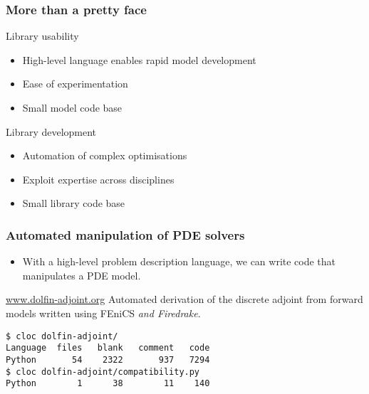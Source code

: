 \documentclass[presentation]{beamer}
\begin{document}
\begin{frame}
  \frametitle{More than a pretty face}

  \begin{block}{Library usability}
    \begin{itemize}
    \item High-level language enables rapid model development
    \item Ease of experimentation
    \item Small model code base
    \end{itemize}
  \end{block}

  \begin{block}{Library development}
    \begin{itemize}
    \item Automation of complex optimisations
    \item Exploit expertise across disciplines
    \item Small library code base
    \end{itemize}
  \end{block}
\end{frame}

\begin{frame}[fragile]
  \frametitle{Automated manipulation of PDE solvers}
  \begin{itemize}
  \item With a high-level problem description language, we can write
    code that manipulates a PDE model.
  \end{itemize}

  \begin{block}{\url{www.dolfin-adjoint.org}}
    Automated derivation of the discrete adjoint from forward models
    written using FEniCS \emph{and Firedrake}.

\begin{verbatim}
$ cloc dolfin-adjoint/
Language  files   blank   comment   code
Python       54    2322       937   7294
$ cloc dolfin-adjoint/compatibility.py
Python        1      38        11    140
\end{verbatim}
  \end{block}
\end{frame}
\end{document}
